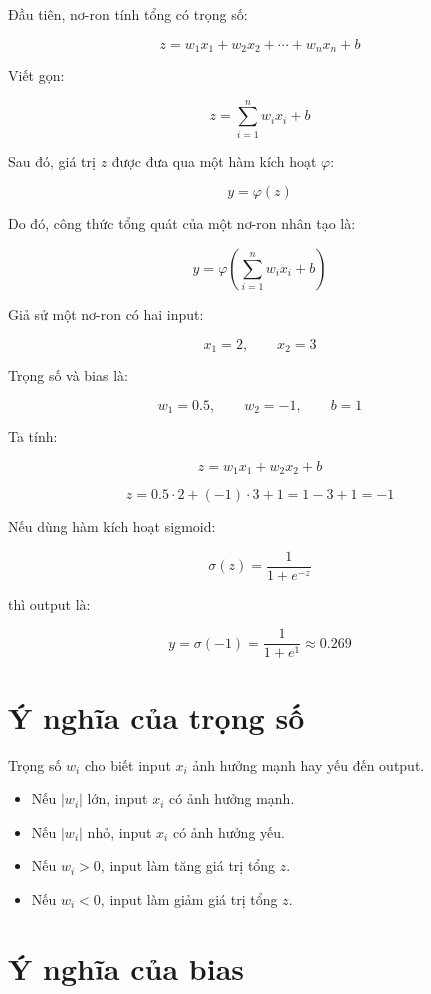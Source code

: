 \documentclass[12pt,a4paper]{report}
\begin{document}
Đầu tiên, nơ-ron tính tổng có trọng số:

\[
    z = w_1x_1 + w_2x_2 + \cdots + w_nx_n + b
\]

Viết gọn:

\[
    z = \sum_{i=1}^{n} w_i x_i + b
\]

Sau đó, giá trị $z$ được đưa qua một hàm kích hoạt $\varphi$:

\[
    y = \varphi(z)
\]

Do đó, công thức tổng quát của một nơ-ron nhân tạo là:

\[
    y = \varphi\left(\sum_{i=1}^{n} w_i x_i + b\right)
\]

\begin{vidu}
Giả sử một nơ-ron có hai input:

\[
    x_1 = 2, \qquad x_2 = 3
\]

Trọng số và bias là:

\[
    w_1 = 0.5, \qquad w_2 = -1, \qquad b = 1
\]

Ta tính:

\[
    z = w_1x_1 + w_2x_2 + b
\]

\[
    z = 0.5 \cdot 2 + (-1)\cdot 3 + 1 = 1 - 3 + 1 = -1
\]

Nếu dùng hàm kích hoạt sigmoid:

\[
    \sigma(z) = \frac{1}{1+e^{-z}}
\]

thì output là:

\[
    y = \sigma(-1) = \frac{1}{1+e^1} \approx 0.269
\]
\end{vidu}

\section{Ý nghĩa của trọng số}

Trọng số $w_i$ cho biết input $x_i$ ảnh hưởng mạnh hay yếu đến output.

\begin{itemize}
    \item Nếu $|w_i|$ lớn, input $x_i$ có ảnh hưởng mạnh.
    \item Nếu $|w_i|$ nhỏ, input $x_i$ có ảnh hưởng yếu.
    \item Nếu $w_i > 0$, input làm tăng giá trị tổng $z$.
    \item Nếu $w_i < 0$, input làm giảm giá trị tổng $z$.
\end{itemize}

\section{Ý nghĩa của bias}
\end{document}
